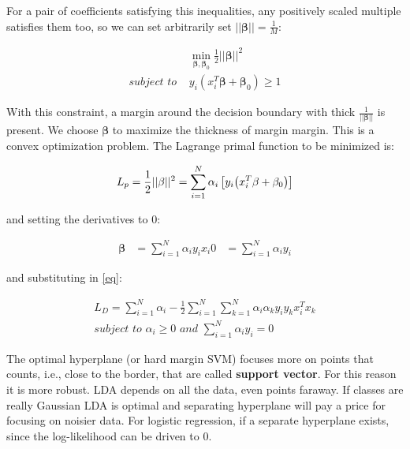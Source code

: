 \documentclass[12pt, letterpaper]{article}
\theoremstyle{definition}
\newcommand{\be}{\mathbf{\beta}}
\DeclarePairedDelimiter\autobracket{(}{)}
\newcommand{\br}[1]{\autobracket*{#1}}
\let\tb\textbf
\begin{document}
For a pair of coefficients satisfying this inequalities, any positively scaled multiple satisfies them too, so we can set arbitrarily set $||\be||=\frac{1}{M}$:

\begin{equation}
\begin{aligned}
&\min_{\be, \be_0}{\frac{1}{2}||\be||^2}\\
\textit{subject to } &y_i(x_i^T\be+\be_0)\ge1
\end{aligned}
\end{equation}

With this constraint, a margin around the decision boundary with thick $\frac{1}{||\be||}$ is present. We choose $\be$ to maximize the thickness of margin margin.  This is a convex optimization problem. The Lagrange primal function to be minimized is:

\begin{equation}
\label{eq}
L_p = \frac{1}{2} ||\be||^2 = \sum_{i=1}^N \alpha_i\left[ y_i \br{x_i^T\be+\be_0}\right]

\end{equation}

and setting the derivatives to $0$:

\begin{equation}
\begin{aligned}
\be &= \sum_{i=1}^N \alpha_i y_i x_i
0  &= \sum_{i=1}^N \alpha_i y_i
\end{aligned}
\end{equation}

and substituting in \autoref{eq}:

\begin{equation}
\begin{aligned}
L_D = \sum_{i=1}^N \alpha_i -\frac{1}{2}\sum_{i=1}^N\sum_{k=1}^N \alpha_i \alpha_ky_iy_kx_i^Tx_k\\
\textit{subject to } \alpha_i\ge0 \textit{ and } \sum_{i=1}^N \alpha_iy_i=0
\end{aligned}
\end{equation}
\fi


The optimal hyperplane (or hard margin SVM) focuses more on points that counts, i.e., close to the border, that are called \tb{support vector}. For this reason it is more robust. LDA depends on all the data, even points faraway. If classes are really Gaussian LDA is optimal and separating hyperplane will pay a price for focusing on noisier data.
For logistic regression, if a separate hyperplane exists, since the log-likelihood can be driven to $0$.
\end{document}
